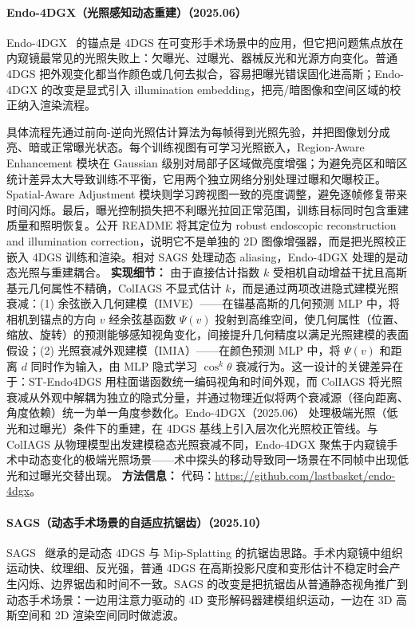 \paragraph{Endo-4DGX（光照感知动态重建）（2025.06）}
Endo-4DGX~\cite{2506_23308} 的锚点是 4DGS 在可变形手术场景中的应用，但它把问题焦点放在内窥镜最常见的光照失败上：欠曝光、过曝光、器械反光和光源方向变化。普通 4DGS 把外观变化都当作颜色或几何去拟合，容易把曝光错误固化进高斯；Endo-4DGX 的改变是显式引入 illumination embedding，把亮/暗图像和空间区域的校正纳入渲染流程。

具体流程先通过前向-逆向光照估计算法为每帧得到光照先验，并把图像划分成亮、暗或正常曝光状态。每个训练视图有可学习光照嵌入，Region-Aware Enhancement 模块在 Gaussian 级别对局部子区域做亮度增强；为避免亮区和暗区统计差异太大导致训练不平衡，它用两个独立网络分别处理过曝和欠曝校正。Spatial-Aware Adjustment 模块则学习跨视图一致的亮度调整，避免逐帧修复带来时间闪烁。最后，曝光控制损失把不利曝光拉回正常范围，训练目标同时包含重建质量和照明恢复。公开 README 将其定位为 robust endoscopic reconstruction and illumination correction，说明它不是单独的 2D 图像增强器，而是把光照校正嵌入 4DGS 训练和渲染。相对 SAGS 处理动态 aliasing，Endo-4DGX 处理的是动态光照与重建耦合。
\textbf{实现细节：} 由于直接估计指数 $k$ 受相机自动增益干扰且高斯基元几何属性不精确，ColIAGS 不显式估计 $k$，而是通过两项改进隐式建模光照衰减：(1) 余弦嵌入几何建模（IMVE）——在锚基高斯的几何预测 MLP 中，将相机到锚点的方向 $v$ 经余弦基函数 $\Psi(v)$ 投射到高维空间，使几何属性（位置、缩放、旋转）的预测能够感知视角变化，间接提升几何精度以满足光照建模的表面假设；(2) 光照衰减外观建模（IMIA）——在颜色预测 MLP 中，将 $\Psi(v)$ 和距离 $d$ 同时作为输入，由 MLP 隐式学习 $\cos^k\theta$ 衰减行为。这一设计的关键差异在于：ST-Endo4DGS 用柱面谐函数统一编码视角和时间外观，而 ColIAGS 将光照衰减从外观中解耦为独立的隐式分量，并通过物理近似将两个衰减源（径向距离、角度依赖）统一为单一角度参数化。Endo-4DGX（2025.06） 处理极端光照（低光和过曝光）条件下的重建，在 4DGS 基线上引入层次化光照校正管线。与 ColIAGS 从物理模型出发建模稳态光照衰减不同，Endo-4DGX 聚焦于内窥镜手术中动态变化的极端光照场景——术中探头的移动导致同一场景在不同帧中出现低光和过曝光交替出现。
\textbf{方法信息：} 代码：\url{https://github.com/lastbasket/endo-4dgx}。



\paragraph{SAGS（动态手术场景的自适应抗锯齿）（2025.10）}
SAGS~\cite{2510_27318} 继承的是动态 4DGS 与 Mip-Splatting 的抗锯齿思路。手术内窥镜中组织运动快、纹理细、反光强，普通 4DGS 在高斯投影尺度和变形估计不稳定时会产生闪烁、边界锯齿和时间不一致。SAGS 的改变是把抗锯齿从普通静态视角推广到动态手术场景：一边用注意力驱动的 4D 变形解码器建模组织运动，一边在 3D 高斯空间和 2D 渲染空间同时做滤波。

